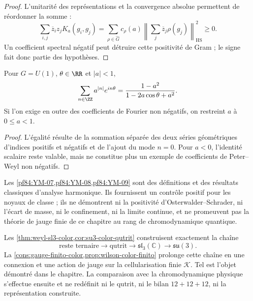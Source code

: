 \begin{proof}
L'unitarité des représentations et la convergence absolue permettent
de réordonner la somme :
\[
 \sum_{i,j}\overline z_i z_jK_a(g_i,g_j)
 =
 \sum_{\rho\in\widehat G}
 c_\rho(a)
 \left\lVert
 \sum_j\overline z_j\rho(g_j)
 \right\rVert_{\mathrm{HS}}^2\ge0.
\]
Un coefficient spectral négatif peut détruire cette positivité de Gram ;
le signe fait donc partie des hypothèses.
\end{proof}

\begin{lemma}
\label{pf84:YM-09}
Pour \(G=U(1)\), \(\theta\in\RR\) et \(|a|<1\),
\[
 \sum_{n\in\ZZ}a^{|n|}e^{in\theta}
 =\frac{1-a^2}{1-2a\cos\theta+a^2}.
\]
Si l'on exige en outre des coefficients de Fourier non négatifs, on restreint
\(a\) à \(0\le a<1\).
\end{lemma}

\begin{proof}
L'égalité résulte de la sommation séparée des deux séries géométriques
d'indices positifs et négatifs et de l'ajout du mode \(n=0\). Pour \(a<0\),
l'identité scalaire reste valable, mais ne constitue plus un exemple de
coefficients de Peter--Weyl non négatifs.
\end{proof}

\begin{remark}
Les \cref{pf84:YM-07,pf84:YM-08,pf84:YM-09} sont des définitions et des résultats
classiques d'analyse harmonique. Ils fournissent un contrôle positif pour
les noyaux de classe ; ils ne démontrent ni la positivité d'Osterwalder--Schrader, ni l'écart de
masse, ni le confinement, ni la limite continue, et ne promeuvent pas la théorie de jauge
finie de ce chapitre au rang de chromodynamique quantique.
\end{remark}

\begin{exactbox}[title={Clôture algébrique de la couleur}]
Les \cref{thm:weyl-sl3-color,cor:su3-color-qutrit} construisent exactement la
chaîne
\[
\text{reste ternaire}\longrightarrow
\text{qutrit}\longrightarrow
\mathfrak{sl}_3(\mathbb C)\longrightarrow\mathfrak{su}(3).
\]
La \cref{cons:gauge-finito-color,prop:wilson-color-finito} prolonge cette
chaîne en une connexion et une action de jauge sur la cellularisation finie
\(\mathcal K\). Tel est l'objet démontré dans le chapitre. La
comparaison avec la chromodynamique physique s'effectue ensuite et ne redéfinit ni le
qutrit, ni le bilan \(12+12+12\), ni la représentation construite.
\end{exactbox}
